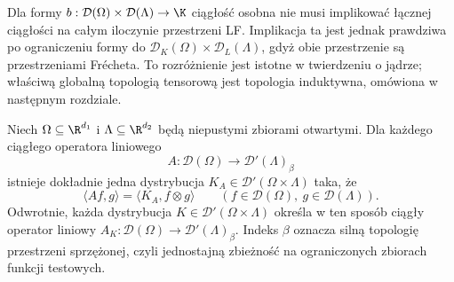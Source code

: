 \begin{uwaga}
\label{rem:kernel-separate23}
Dla formy $b:\mathcal D(\Omega)\times\mathcal D(\Lambda)\to\K$
ciągłość osobna nie musi implikować łącznej ciągłości na
całym iloczynie przestrzeni LF. Implikacja ta jest jednak
prawdziwa po ograniczeniu formy do
$\mathcal D_K(\Omega)\times\mathcal D_L(\Lambda)$,
gdyż obie przestrzenie są przestrzeniami Frécheta.
To rozróżnienie jest istotne w twierdzeniu o jądrze;
właściwą globalną topologią tensorową jest topologia
induktywna, omówiona w następnym rozdziale.
\end{uwaga}

\begin{twierdzenie}
\label{thm:schwartz-kernel23}
Niech $\Omega\subseteq\R^{d_1}$ i
$\Lambda\subseteq\R^{d_2}$ będą niepustymi zbiorami
otwartymi. Dla każdego ciągłego operatora liniowego
\[
 A:\mathcal D(\Omega)\longrightarrow
 \mathcal D'(\Lambda)_\beta
\]
istnieje dokładnie jedna dystrybucja
$K_A\in\mathcal D'(\Omega\times\Lambda)$ taka, że
\[
 \langle Af,g\rangle=\langle K_A,f\otimes g\rangle
 \qquad(f\in\mathcal D(\Omega),\ g\in\mathcal D(\Lambda)).
\]
Odwrotnie, każda dystrybucja
$K\in\mathcal D'(\Omega\times\Lambda)$ określa w ten
sposób ciągły operator liniowy
$A_K:\mathcal D(\Omega)\to\mathcal D'(\Lambda)_\beta$.
Indeks $\beta$ oznacza silną topologię przestrzeni sprzężonej,
czyli jednostajną zbieżność na ograniczonych zbiorach
funkcji testowych.
\end{twierdzenie}
